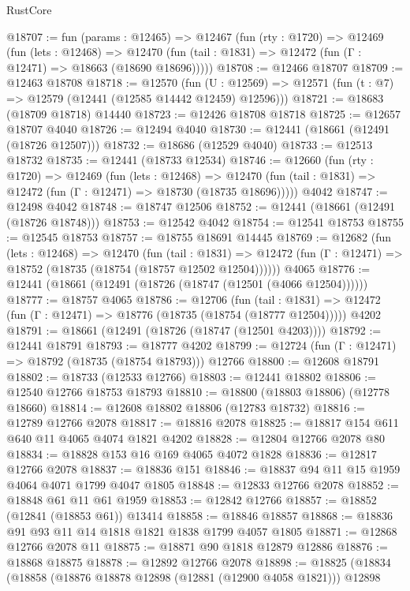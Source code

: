 \begin{lexlean}{RustCore}
\begin{coremodule}
@18707 := fun (params : @12465) =>
  @12467
    (fun (rty : @1720) =>
    @12469
      (fun (lets : @12468) =>
      @12470 (fun (tail : @1831) => @12472 (fun (Γ : @12471) => @18663 (@18690 @18696)))))
@18708 := @12466 @18707
@18709 := @12463 @18708
@18718 := @12570
    (fun (U : @12569) => @12571 (fun (t : @7) => @12579 (@12441 (@12585 @14442 @12459) @12596)))
@18721 := @18683 (@18709 @18718) @14440
@18723 := @12426 @18708 @18718
@18725 := @12657 @18707 @4040
@18726 := @12494 @4040
@18730 := @12441 (@18661 (@12491 (@18726 @12507)))
@18732 := @18686 (@12529 @4040)
@18733 := @12513 @18732
@18735 := @12441 (@18733 @12534)
@18746 := @12660
    (fun (rty : @1720) =>
    @12469
      (fun (lets : @12468) =>
      @12470 (fun (tail : @1831) => @12472 (fun (Γ : @12471) => @18730 (@18735 @18696)))))
    @4042
@18747 := @12498 @4042
@18748 := @18747 @12506
@18752 := @12441 (@18661 (@12491 (@18726 @18748)))
@18753 := @12542 @4042
@18754 := @12541 @18753
@18755 := @12545 @18753
@18757 := @18755 @18691 @14445
@18769 := @12682
    (fun (lets : @12468) =>
    @12470
      (fun (tail : @1831) =>
      @12472 (fun (Γ : @12471) => @18752 (@18735 (@18754 (@18757 @12502 @12504))))))
    @4065
@18776 := @12441 (@18661 (@12491 (@18726 (@18747 (@12501 (@4066 @12504))))))
@18777 := @18757 @4065
@18786 := @12706
    (fun (tail : @1831) => @12472 (fun (Γ : @12471) => @18776 (@18735 (@18754 (@18777 @12504)))))
    @4202
@18791 := @18661 (@12491 (@18726 (@18747 (@12501 @4203))))
@18792 := @12441 @18791
@18793 := @18777 @4202
@18799 := @12724 (fun (Γ : @12471) => @18792 (@18735 (@18754 @18793))) @12766
@18800 := @12608 @18791
@18802 := @18733 (@12533 @12766)
@18803 := @12441 @18802
@18806 := @12540 @12766 @18753 @18793
@18810 := @18800 (@18803 @18806) (@12778 @18660)
@18814 := @12608 @18802 @18806 (@12783 @18732)
@18816 := @12789 @12766 @2078
@18817 := @18816 @2078
@18825 := @18817 @154 @611 @640 @11 @4065 @4074 @1821 @4202
@18828 := @12804 @12766 @2078 @80
@18834 := @18828 @153 @16 @169 @4065 @4072 @1828
@18836 := @12817 @12766 @2078
@18837 := @18836 @151
@18846 := @18837 @94 @11 @15 @1959 @4064 @4071 @1799 @4047 @1805
@18848 := @12833 @12766 @2078
@18852 := @18848 @61 @11 @61 @1959
@18853 := @12842 @12766
@18857 := @18852 (@12841 (@18853 @61)) @13414
@18858 := @18846 @18857
@18868 := @18836 @91 @93 @11 @14 @1818 @1821 @1838 @1799 @4057 @1805
@18871 := @12868 @12766 @2078 @11
@18875 := @18871 @90 @1818 @12879 @12886
@18876 := @18868 @18875
@18878 := @12892 @12766 @2078
@18898 := @18825
    (@18834
      (@18858
        (@18876 @18878 @12898 (@12881 (@12900 @4058 @1821)))
        @12898

\end{coremodule}
\end{lexlean}

